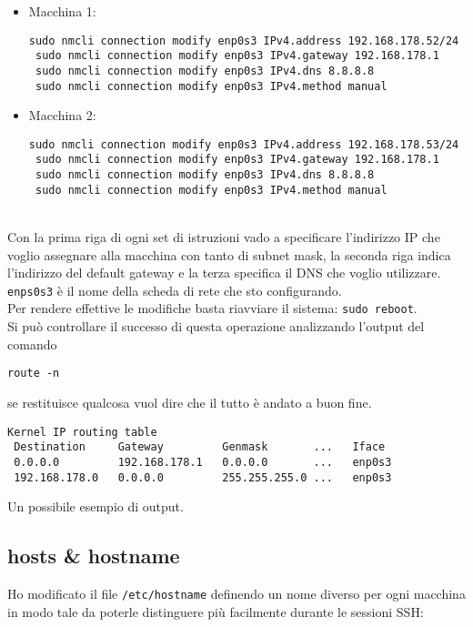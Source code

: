 \begin{itemize}
	\item Macchina 1: 
	\begin{lstlisting}[style=cmd]
 sudo nmcli connection modify enp0s3 IPv4.address 192.168.178.52/24
 sudo nmcli connection modify enp0s3 IPv4.gateway 192.168.178.1
 sudo nmcli connection modify enp0s3 IPv4.dns 8.8.8.8
 sudo nmcli connection modify enp0s3 IPv4.method manual
	\end{lstlisting}
	\item Macchina 2:
		\begin{lstlisting}[style=cmd]
 sudo nmcli connection modify enp0s3 IPv4.address 192.168.178.53/24
 sudo nmcli connection modify enp0s3 IPv4.gateway 192.168.178.1
 sudo nmcli connection modify enp0s3 IPv4.dns 8.8.8.8
 sudo nmcli connection modify enp0s3 IPv4.method manual
	\end{lstlisting}
\end{itemize}
\ \\
Con la prima riga di ogni set di istruzioni vado a specificare l'indirizzo IP che voglio assegnare alla macchina con tanto di subnet mask, la seconda riga indica l'indirizzo del default gateway e la terza specifica il DNS che voglio utilizzare. \lstinline[style=cmd]|enps0s3| \`{e} il nome della scheda di rete che sto configurando.\\
Per rendere effettive le modifiche basta riavviare il sistema: \lstinline[style=cmd]|sudo reboot|.\\
Si pu\`{o} controllare il successo di questa operazione analizzando l'output del comando
\begin{lstlisting}[style=cmd]
 route -n
\end{lstlisting}
se restituisce qualcosa vuol dire che il tutto \`{e} andato a buon fine.\\

\begin{lstlisting}[style=output]
 Kernel IP routing table
 Destination     Gateway         Genmask       ...   Iface
 0.0.0.0         192.168.178.1   0.0.0.0       ...   enp0s3
 192.168.178.0   0.0.0.0         255.255.255.0 ...   enp0s3
\end{lstlisting}
Un possibile esempio di output.
\pagebreak

\subsection{hosts \& hostname}
\label{sec:hosts}

Ho modificato il file \lstinline[style=cmd]|/etc/hostname| definendo un nome diverso per ogni macchina in modo tale da poterle distinguere pi\`{u} facilmente durante le sessioni SSH: 

